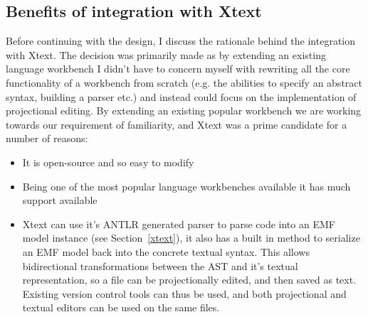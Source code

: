\documentclass{article}
\begin{document}
\subsection{Benefits of integration with Xtext}\label{integrationWithXtext}
Before continuing with the design, I discuss the rationale behind the integration with Xtext. The decision was primarily made as by extending an existing language workbench I didn't have to concern myself with rewriting all the core functionality of a workbench from scratch (e.g. the abilities to specify an abstract syntax, building a parser etc.) and instead could focus on the implementation of projectional editing. By extending an existing popular workbench we are working towards our \RFamiliarity requirement of familiarity, and Xtext was a prime candidate for a number of reasons:
\begin{itemize}
\item{It is open-source and so easy to modify}
\item{Being one of the most popular language workbenches available it has much support available}
\item{Xtext can use it's ANTLR generated parser to parse code into an EMF model instance (see Section~\ref{xtext}), it also has a built in method to serialize an EMF model back into the concrete textual syntax. This allows bidirectional transformations between the AST and it's textual representation, so a file can be projectionally edited, and then saved as text. Existing version control tools can thus be used, and both projectional and textual editors can be used on the same files.}
\end{itemize}
\end{document}

